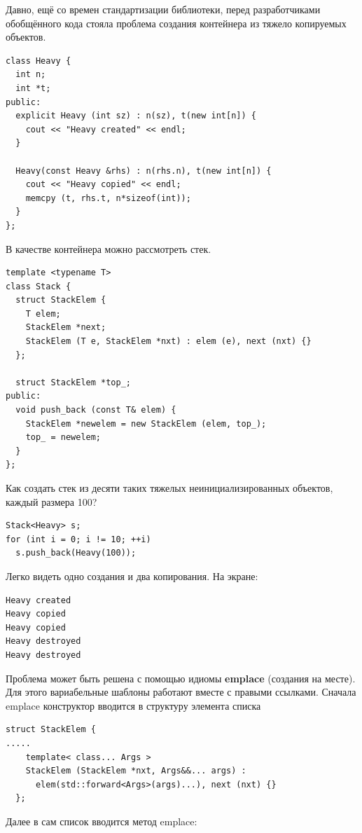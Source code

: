 \documentclass[a4paper,12pt,oneside]{article}
\begin{document}
Давно, ещё со времен стандартизации библиотеки, перед разработчиками обобщённого кода стояла проблема создания контейнера из тяжело копируемых объектов.

\begin{lstlisting}
class Heavy {
  int n;
  int *t;
public:
  explicit Heavy (int sz) : n(sz), t(new int[n]) {
    cout << "Heavy created" << endl;
  }

  Heavy(const Heavy &rhs) : n(rhs.n), t(new int[n]) {
    cout << "Heavy copied" << endl;
    memcpy (t, rhs.t, n*sizeof(int));
  }
};
\end{lstlisting}

В качестве контейнера можно рассмотреть стек.

\begin{lstlisting}
template <typename T>
class Stack {
  struct StackElem {
    T elem;
    StackElem *next;
    StackElem (T e, StackElem *nxt) : elem (e), next (nxt) {}
  };

  struct StackElem *top_;
public:
  void push_back (const T& elem) {
    StackElem *newelem = new StackElem (elem, top_);
    top_ = newelem;
  }
};
\end{lstlisting}

Как создать стек из десяти таких тяжелых неинициализированных объектов, каждый размера 100?

\begin{lstlisting}
Stack<Heavy> s;
for (int i = 0; i != 10; ++i)
  s.push_back(Heavy(100));
\end{lstlisting}

Легко видеть одно создания и два копирования. На экране:

\begin{verbatim}
Heavy created
Heavy copied
Heavy copied
Heavy destroyed
Heavy destroyed
\end{verbatim}

Проблема может быть решена с помощью идиомы \textbf{emplace} (создания на месте). Для этого вариабельные шаблоны работают вместе с правыми ссылками. Сначала emplace конструктор вводится в структуру элемента списка

\begin{lstlisting}
struct StackElem {
.....
    template< class... Args >
    StackElem (StackElem *nxt, Args&&... args) : 
      elem(std::forward<Args>(args)...), next (nxt) {}
  };
\end{lstlisting}

Далее в сам список вводится метод emplace:
\end{document}

